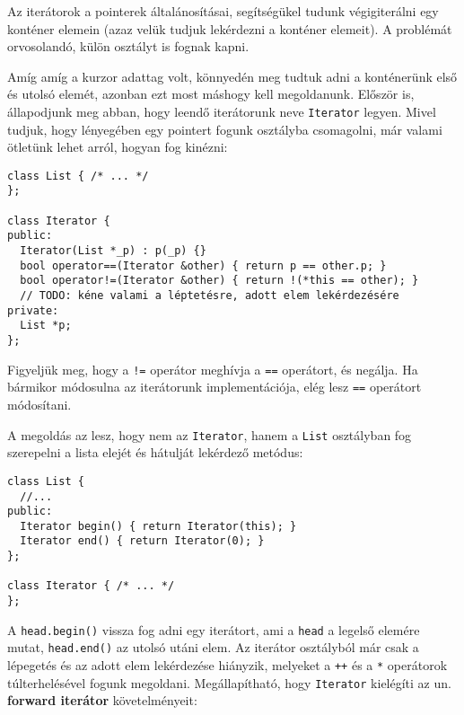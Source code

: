 \documentclass[../cpp_book/cpp_book.tex]{subfiles}
\begin{document}
	Az iterátorok a pointerek általánosításai, segítségükel tudunk végigiterálni egy konténer elemein (azaz velük tudjuk lekérdezni a konténer elemeit). A problémát orvosolandó, külön osztályt is fognak kapni.
	
	Amíg amíg a kurzor adattag volt, könnyedén meg tudtuk adni a konténerünk első és utolsó elemét, azonban ezt most máshogy kell megoldanunk. Először is, állapodjunk meg abban, hogy leendő iterátorunk neve \texttt{Iterator} legyen. Mivel tudjuk, hogy lényegében egy pointert fogunk osztályba csomagolni, már valami ötletünk lehet arról, hogyan fog kinézni:
	\begin{lstlisting}
class List { /* ... */
};

class Iterator {
public:
  Iterator(List *_p) : p(_p) {}
  bool operator==(Iterator &other) { return p == other.p; }
  bool operator!=(Iterator &other) { return !(*this == other); }
  // TODO: kéne valami a léptetésre, adott elem lekérdezésére
private:
  List *p;
};
	\end{lstlisting}
	\begin{note}
		Figyeljük meg, hogy a \texttt{!=} operátor meghívja a \texttt{==} operátort, és negálja. Ha bármikor módosulna az iterátorunk implementációja, elég lesz \texttt{==} operátort módosítani.
	\end{note}
	A megoldás az lesz, hogy nem az \texttt{Iterator}, hanem a \texttt{List} osztályban fog szerepelni a lista elejét és hátulját lekérdező metódus:
	\begin{lstlisting}
class List {
  //...
public:
  Iterator begin() { return Iterator(this); }
  Iterator end() { return Iterator(0); }
};

class Iterator { /* ... */
};
	\end{lstlisting}
	 A \texttt{head.begin()} vissza fog adni egy iterátort, ami a \texttt{head} a legelső elemére mutat, \texttt{head.end()} az utolsó utáni elem. Az iterátor osztályból már csak a lépegetés és az adott elem lekérdezése hiányzik, melyeket a \texttt{++} és a \texttt{*} operátorok túlterhelésével fogunk megoldani. Megállapítható, hogy \texttt{Iterator} kielégíti az un. \textbf{forward iterátor} követelményeit:
\end{document}
